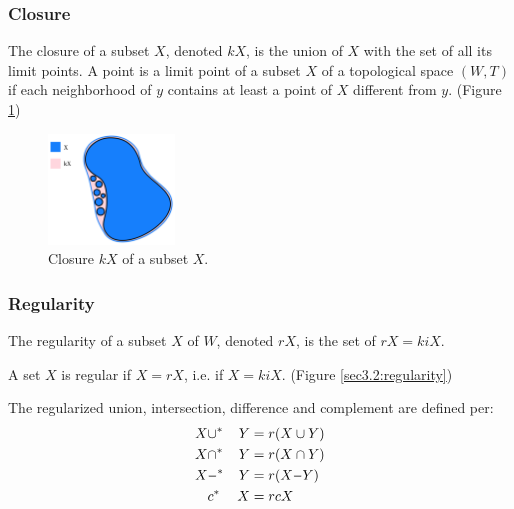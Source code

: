 \documentclass[a4paper,11pt,oneside]{article}
\newcommand{\minus}{\scalebox{0.9}[1.0]{$-$}} %
\begin{document}
\subsubsection{Closure}
    
\begin{definition}
	The closure of a subset $X$, denoted $kX$, is the union of $X$ with the set of all its limit points. A point is a limit point of a subset $X$ of a topological space $(W, T)$ if each neighborhood of $y$ contains at least a point of $X$ different from $y$.  \cite{Requicha1978MathematicalFO} (Figure \ref{sec3.2:closure})
\end{definition}
    
\begin{figure}[ht]
	\begin{center}
		\includegraphics[width=0.3\textwidth]{section3/3.2/closure.png}
	\end{center}
	\caption{Closure $kX$ of a subset $X$.}
	\label{sec3.2:closure}
\end{figure}
    
\subsubsection{Regularity}
    
\begin{definition}[Regularity]
	The regularity of a subset $X$ of $W$, denoted $rX$, is the set of $rX = kiX$. \cite{mansfield_1987}
\end{definition}
\begin{definition}
	A set $X$ is regular if $X = rX$, i.e. if $X = kiX$.  \cite{mansfield_1987} (Figure \ref{sec3.2:regularity}) 
\end{definition}
    
\begin{definition}
	The regularized union, intersection, difference and complement are defined per:
	\begin{alignat*}{3}
		X & \cup^* & Y  & = r(X \cup Y)   \\
		X  & \cap^* & Y  & = r(X \cap Y)   \\
		X & \minus^* & Y & = r(X \minus Y) \\
		&c{^*}&X      & = rcX           
	\end{alignat*}
\end{definition}
    
\end{document}

